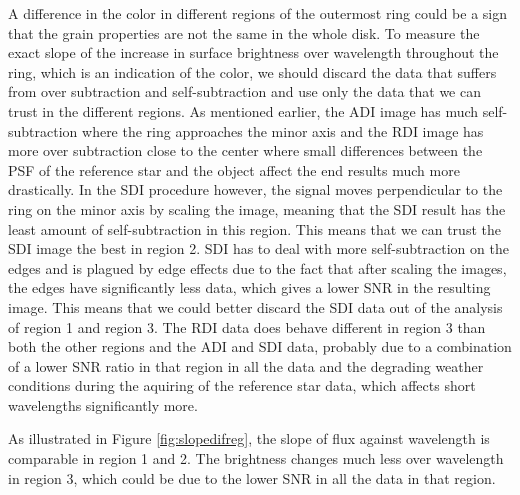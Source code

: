 \documentclass[twoside,single,12pt]{lion-msc}
\begin{document}
A difference in the color in different regions of the outermost ring could be a sign that the grain properties are not the same in the whole disk. To measure the exact slope of the increase in surface brightness over wavelength throughout the ring, which is an indication of the color, we should discard the data that suffers from over subtraction and self-subtraction and use only the data that we can trust in the different regions. As mentioned earlier, the ADI image has much self-subtraction where the ring approaches the minor axis and the RDI image has more over subtraction close to the center where small differences between the PSF of the reference star and the object affect the end results much more drastically. In the SDI procedure however, the signal moves perpendicular to the ring on the minor axis by scaling the image, meaning that the SDI result has the least amount of self-subtraction in this region. This means that we can trust the SDI image the best in region 2. SDI has to deal with more self-subtraction on the edges and is plagued by edge effects due to the fact that after scaling the images, the edges have significantly less data, which gives a lower SNR in the resulting image. This means that we could better discard the SDI data out of the analysis of region 1 and region 3. The RDI data does behave different in region 3 than both the other regions and the ADI and SDI data, probably due to a combination of a lower SNR ratio in that region in all the data and the degrading weather conditions during the aquiring of the reference star data, which affects short wavelengths significantly more.
\bigskip

As illustrated in Figure \ref{fig:slopedifreg}, the slope of flux against wavelength is comparable in region 1 and 2. The brightness changes much less over wavelength in region 3, which could be due to the lower SNR in all the data in that region.
\end{document}
